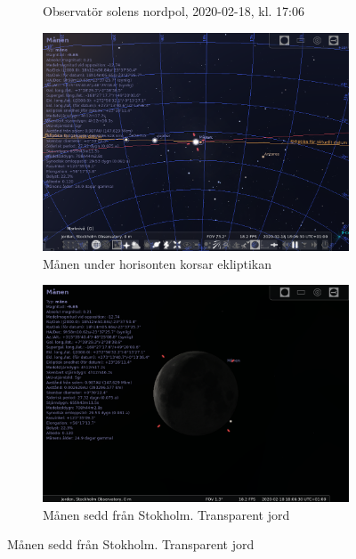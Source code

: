 \documentclass[./exercises.tex]{subfiles}
\begin{document}
\begin{itemize}
\begin{figure}[H]
\begin{subfigure}[b]{0.45\textwidth}
         \caption{Observatör solens nordpol, 2020-02-18, kl. 17:06}
         \label{fig:three sin x}
     \end{subfigure}
     \hfill
     \begin{subfigure}[b]{0.45\textwidth}
         \centering
         \includegraphics[width=\textwidth]{Stellarium1/3rdQ/stellarium-002.png}
         \caption{Månen under horisonten korsar ekliptikan }
         \label{fig:three sin x}
     \end{subfigure}
     \hfill
     \begin{subfigure}[b]{0.45\textwidth}
         \centering
         \includegraphics[width=\textwidth]{Stellarium1/3rdQ/stellarium-003.png}
         \caption{Månen sedd från Stokholm. Transparent jord}
         \label{fig:three sin x}
     \end{subfigure}

\end{figure}
\end{itemize}
\end{document}
